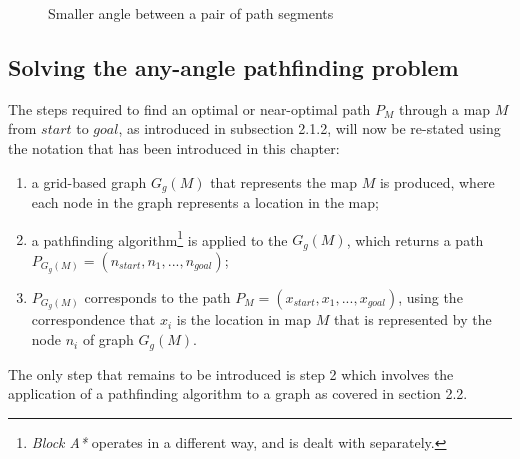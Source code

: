 \documentclass[12pt,notitlepage]{report}
\begin{document}
\begin{figure}
   \centering
    \caption{Smaller angle between a pair of path segments}
  \end{figure}


\subsection{Solving the any-angle pathfinding problem}

\noindent
The steps required to find an optimal or near-optimal path $P_{M}$ through a map $M$ from $start$ to $goal$, as introduced in subsection 2.1.2, will now be re-stated using the notation that has been introduced in this chapter:
\begin{enumerate}
\item a grid-based graph $G_{g}(M)$ that represents the map $M$ is produced, where each node in the graph represents a location in the map; 
\item a pathfinding algorithm\footnote{{\em Block A*} operates in a different way, and is dealt with separately.} is applied to the $G_{g}(M)$, which returns a path $P_{G_{g}(M)} = (n_{start},n_{1},...,n_{goal})$;
\item $P_{G_{g}(M)}$ corresponds to the path $P_{M} = (x_{start},x_{1},...,x_{goal})$, using the correspondence that $x_{i}$ is the location in map $M$ that is represented by the node $n_{i}$ of graph $G_{g}(M)$.
\end{enumerate}

\noindent
The only step that remains to be introduced is step 2 which involves the application of a pathfinding algorithm to a graph as covered in section 2.2.
\end{document}
